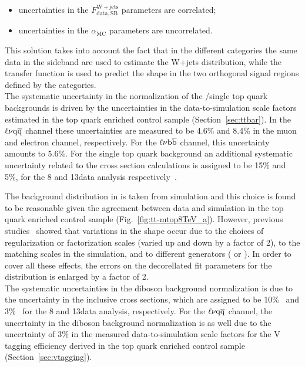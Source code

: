 \begin{itemize}
\item uncertainties in the $F_\mathrm{data, SB}^{\mathrm{W+jets}}$ parameters are correlated;
\item uncertainties in the $\alpha_\mathrm{MC}$ parameters are uncorrelated.
\end{itemize}

This solution takes into account the fact that in the different \mJ categories the same data in the sideband are used to estimate the W+jets distribution, while the transfer function is used to predict the shape in the two orthogonal signal regions defined by the categories.\\

The systematic uncertainty in the normalization of the \ttbar/single top quark backgrounds is driven by the uncertainties in the data-to-simulation scale factors estimated in the top quark enriched control sample (Section~\ref{sec:ttbar}). In the $\ell\nu\mathrm{q}\overline{\mathrm{q}}$ channel these uncertainties are measured to be 4.6\% and 8.4\% in the muon and electron channel, respectively. For the $\ell\nu{\mathrm{b}\overline{\mathrm{b}}}$ channel, this uncertainty amounts to 5.6\%.
For the single top quark background an additional systematic uncertainty related to the cross section calculations is assigned to be 15\% and 5\%, for the 8 and 13\TeV data analysis respectively~\cite{Chatrchyan:2012ep,Kant:2014oha}.

The \ttbar background distribution in \mlvj is taken from simulation and this choice is found to be reasonable given the
agreement between data and simulation in the top quark enriched control sample (Fig.~\ref{fig:tt-mtop8TeV_a}).
However, previous studies~\cite{Khachatryan:2014gha} showed that variations in the shape occur due to the choices of regularization or factorization scales (varied up and down by a factor of 2),
to the matching scales in the \MADGRAPH{} simulation, and to different generators (\MADGRAPH{} or \POWHEG{}).
In order to cover all these effects, the errors on the decorellated fit parameters for the \ttbar distribution is enlarged by a factor of 2.\\

The systematic uncertainties in the diboson background normalization is due to the uncertainty in the inclusive cross sections, which are assigned to be 10\%~\cite{Chatrchyan:2013oev} and 3\%~\cite{Gehrmann:2014fva} for the 8 and 13\TeV data analysis, respectively.
For the $\ell\nu\mathrm{q}\overline{\mathrm{q}}$ channel, the uncertainty in the diboson background normalization is as well due to the uncertainty of 3\% in the measured data-to-simulation scale factors for the V tagging efficiency derived in the top quark enriched control sample (Section~\ref{sec:vtagging}).\\

